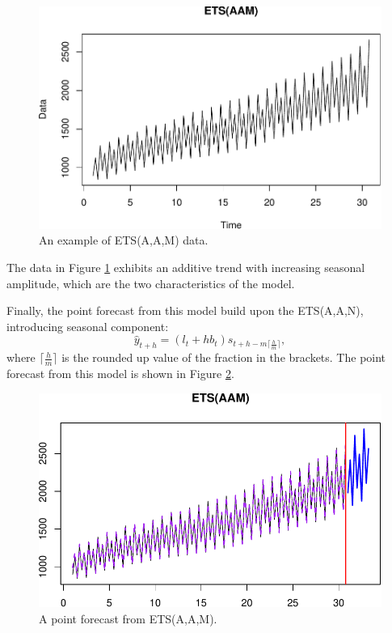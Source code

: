 \documentclass[
]{book}
\theoremstyle{definition}
\theoremstyle{definition}
\theoremstyle{definition}
\theoremstyle{definition}
\theoremstyle{remark}
\begin{document}
\begin{figure}
\centering
\includegraphics{Svetunkov--2022----ADAM_files/figure-latex/ETSAAMExample-1.pdf}
\caption{\label{fig:ETSAAMExample}An example of ETS(A,A,M) data.}
\end{figure}

The data in Figure \ref{fig:ETSAAMExample} exhibits an additive trend with increasing seasonal amplitude, which are the two characteristics of the model.

Finally, the point forecast from this model build upon the ETS(A,A,N), introducing seasonal component:
\begin{equation}
    \hat{y}_{t+h} = (l_{t} + h b_t) s_{t+h-m\lceil\frac{h}{m}\rceil},
  \label{eq:ETSAAAForecast}
\end{equation}
where \(\lceil\frac{h}{m}\rceil\) is the rounded up value of the fraction in the brackets. The point forecast from this model is shown in Figure \ref{fig:ETSAAMExampleForecast}.

\begin{figure}
\centering
\includegraphics{Svetunkov--2022----ADAM_files/figure-latex/ETSAAMExampleForecast-1.pdf}
\caption{\label{fig:ETSAAMExampleForecast}A point forecast from ETS(A,A,M).}
\end{figure}
\end{document}
